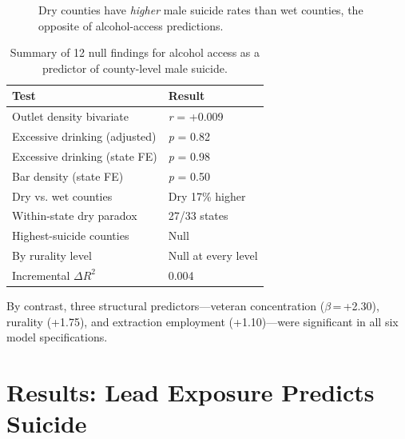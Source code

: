 \documentclass[11pt,twocolumn]{article}
\begin{document}
\begin{figure}[H]
\centering
{}
\caption{Dry counties have \textit{higher} male suicide rates than wet counties, the opposite of alcohol-access predictions.}
\label{fig:drywet}
\end{figure}

\begin{table}[H]
\centering
\small
\caption{Summary of 12 null findings for alcohol access as a predictor of county-level male suicide.}
\label{tab:alcohol}
\begin{tabular}{@{}ll@{}}
\toprule
\textbf{Test} & \textbf{Result} \\
\midrule
Outlet density bivariate & \textit{r} = +0.009 \\
Excessive drinking (adjusted) & \textit{p} = 0.82 \\
Excessive drinking (state FE) & \textit{p} = 0.98 \\
Bar density (state FE) & \textit{p} = 0.50 \\
Dry vs. wet counties & Dry 17\% higher \\
Within-state dry paradox & 27/33 states \\
Highest-suicide counties & Null \\
By rurality level & Null at every level \\
Incremental $\Delta R^2$ & 0.004 \\
\bottomrule
\end{tabular}
\end{table}

By contrast, three structural predictors---veteran concentration ($\beta$\,=\,+2.30), rurality (+1.75), and extraction employment (+1.10)---were significant in all six model specifications.


\section{Results: Lead Exposure Predicts Suicide}
\end{document}
